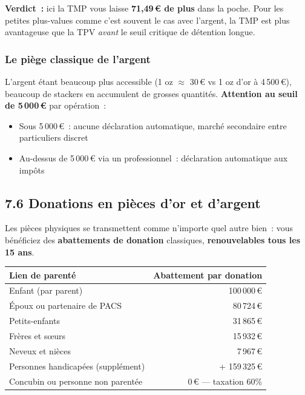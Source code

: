 \documentclass[14pt,a4paper]{extarticle}
\begin{document}
\textbf{Verdict~:} ici la TMP vous laisse \textbf{71,49\,€ de plus} dans la poche. Pour les petites plus-values comme c'est souvent le cas avec l'argent, la TMP est plus avantageuse que la TPV \textit{avant} le seuil critique de détention longue.

\subsubsection*{Le piège classique de l'argent}

L'argent étant beaucoup plus accessible (1 oz $\approx$ 30\,€ vs 1 oz d'or à 4\,500\,€), beaucoup de stackers en accumulent de grosses quantités. \textbf{Attention au seuil de 5\,000\,€} par opération~:

\begin{itemize}
  \item Sous 5\,000\,€~: aucune déclaration automatique, marché secondaire entre particuliers discret
  \item Au-dessus de 5\,000\,€ via un professionnel~: déclaration automatique aux impôts
\end{itemize}

\subsection{7.6 Donations en pièces d'or et d'argent}

Les pièces physiques se transmettent comme n'importe quel autre bien~: vous bénéficiez des \textbf{abattements de donation} classiques, \textbf{renouvelables tous les 15 ans}.

\begin{center}
\begin{tabular}{lr}
\toprule
\textbf{Lien de parenté} & \textbf{Abattement par donation} \\
\midrule
Enfant (par parent) & 100\,000\,€ \\
Époux ou partenaire de PACS & 80\,724\,€ \\
Petits-enfants & 31\,865\,€ \\
Frères et sœurs & 15\,932\,€ \\
Neveux et nièces & 7\,967\,€ \\
Personnes handicapées (supplément) & + 159\,325\,€ \\
\midrule
Concubin ou personne non parentée & 0\,€ --- taxation 60\% \\
\bottomrule
\end{tabular}
\end{center}
\end{document}
